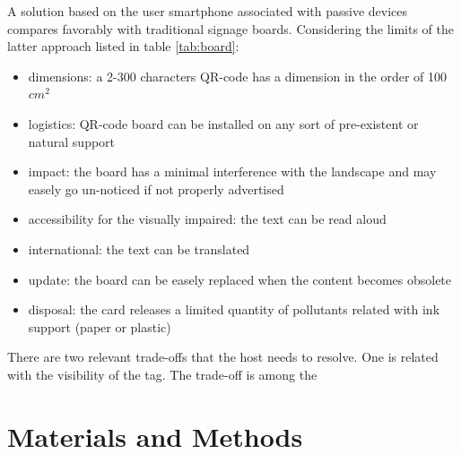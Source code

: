 \documentclass[sustainability,article,submit,pdftex,moreauthors]{Definitions/mdpi}
\begin{document}

A solution based on the user smartphone associated with passive devices compares favorably with traditional signage boards. Considering the limits of the latter approach listed in table \ref{tab:board}:


\begin{itemize}
	\item dimensions: a 2-300 characters QR-code has a dimension in the order of 100 $cm^2$
	\item logistics: QR-code board can be installed on any sort of pre-existent or natural support
	\item impact: the board has a minimal interference with the landscape and may easely go un-noticed if not properly advertised
	\item accessibility for the visually impaired: the text can be read aloud
	\item international: the text can be translated
	\item update: the board can be easely replaced when the content becomes obsolete
	\item disposal: the card releases a limited quantity of pollutants related with ink support (paper or plastic)
\end{itemize}
		
		
There are two relevant trade-offs that the host needs to resolve. One is related with the visibility of the tag. The trade-off is among the  

\section{Materials and Methods}
\end{document}
